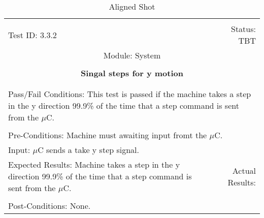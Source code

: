 \documentclass[titlepage]{article}
\begin{document}
\begin{center}%
\begin{table}
\begin{tabular}{|l r|}\hline&\\[-2mm]
	Test ID: 3.3.2	&Status: TBT\\[-3mm]
	\multicolumn{2}{|c|}{Module: System}\\&\\
	\multicolumn{2}{|c|}{\textbf{\large{Singal steps for y motion}}}\\&\\\hline&\\[-3mm]
	\multicolumn{2}{|p{\textwidth}|}{Pass/Fail Conditions: This test is passed if the machine takes a step in the y direction 99.9\% of the time that a step command is sent from the $\mu$C.}\\[1mm]\hline&\\[-3mm]
	\multicolumn{2}{|p{\textwidth}|}{Pre-Conditions: Machine must awaiting input fromt the $\mu$C.}\\[4mm]
	\multicolumn{2}{|p{\textwidth}|}{Input: $\mu$C sends a take y step signal.}\\[2mm]\hline
	\multicolumn{1}{|p{0.49\textwidth}}{Expected Results: Machine takes a step in the y direction 99.9\% of the time that a step command is sent from the $\mu$C.}	&\multicolumn{1}{|p{0.45\textwidth}|}{Actual Results: }\\\hline&\\[-3mm]
	\multicolumn{2}{|p{\textwidth}|}{Post-Conditions: None.}\\\hline
\end{tabular}
\caption{Aligned Shot}
\end{table}
\end{center}
\end{document}
